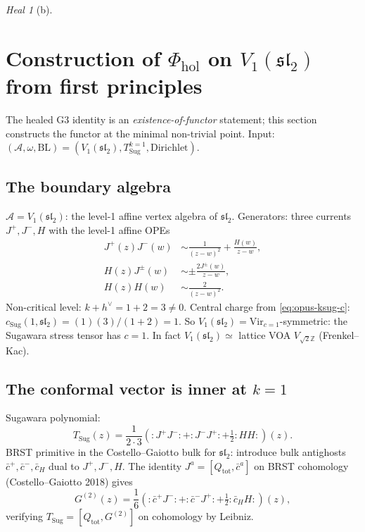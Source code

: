\documentclass{article}
\theoremstyle{definition}
\theoremstyle{remark}
\newtheorem{heal}[theorem]{Heal}
\newcommand{\Phihol}{\Phi_{\mathrm{hol}}}
\newcommand{\cA}{\mathcal{A}}
\begin{document}
\begin{heal}[b]
\section{Construction of $\Phihol$ on $V_1(\mathfrak{sl}_2)$ from first
principles}
\label{sec:opus-construction}

The healed G3 identity is an \emph{existence-of-functor}
statement; this section constructs the functor at the
minimal non-trivial point. Input:
$(\cA, \omega, \mathrm{BL}) = (V_1(\mathfrak{sl}_2),
T_{\mathrm{Sug}}^{k=1}, \mathrm{Dirichlet})$.

\subsection{The boundary algebra}
$\cA = V_1(\mathfrak{sl}_2)$: the level-1 affine vertex
algebra of $\mathfrak{sl}_2$. Generators: three currents
$J^+, J^-, H$ with the level-1 affine OPEs
\begin{align}
  J^+(z) J^-(w) &\sim \frac{1}{(z-w)^2} + \frac{H(w)}{z-w}, \\
  H(z) J^\pm(w) &\sim \pm\frac{2 J^\pm(w)}{z-w}, \\
  H(z) H(w) &\sim \frac{2}{(z-w)^2}.
\end{align}
Non-critical level: $k+h^\vee = 1+2 = 3 \neq 0$. Central
charge from \eqref{eq:opus-ksug-c}:
$c_{\mathrm{Sug}}(1, \mathfrak{sl}_2) =
(1)(3)/(1+2) = 1$. So
$V_1(\mathfrak{sl}_2) = \mathrm{Vir}_{c=1}$-symmetric: the
Sugawara stress tensor has $c=1$. In fact
$V_1(\mathfrak{sl}_2) \simeq$ lattice VOA
$V_{\sqrt{2}\mathbb{Z}}$ (Frenkel--Kac).

\subsection{The conformal vector is inner at $k=1$}
Sugawara polynomial:
\begin{equation}
  T_{\mathrm{Sug}}(z) = \frac{1}{2 \cdot 3}
  \left({:}J^+ J^-{:} + {:}J^- J^+{:} +
  \tfrac{1}{2}{:}H H{:}\right)(z).
\end{equation}
BRST primitive in the Costello--Gaiotto bulk for
$\mathfrak{sl}_2$: introduce bulk antighosts
$\bar c^+, \bar c^-, \bar c_H$ dual to $J^+, J^-, H$. The
identity $J^a = [Q_{\mathrm{tot}}, \bar c^a]$ on
BRST cohomology (Costello--Gaiotto 2018) gives
\begin{equation}
  G^{(2)}(z) = \frac{1}{6}
  \left({:}\bar c^+ J^-{:} + {:}\bar c^- J^+{:} +
  \tfrac{1}{2}{:}\bar c_H H{:}\right)(z),
\end{equation}
verifying $T_{\mathrm{Sug}} = [Q_{\mathrm{tot}}, G^{(2)}]$
on cohomology by Leibniz.


\end{heal}
\end{document}
